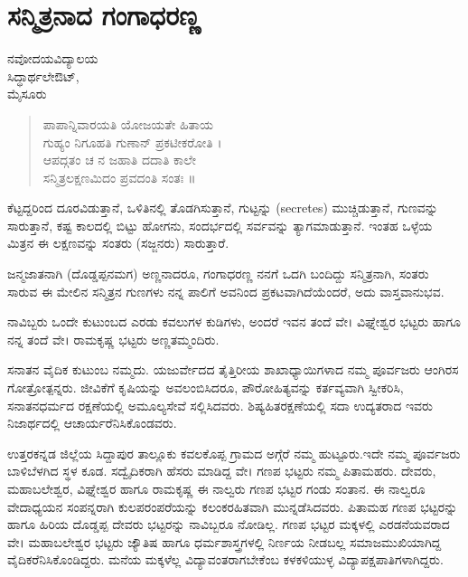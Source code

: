 \chapter{ಸನ್ಮಿತ್ರನಾದ ಗಂಗಾಧರಣ್ಣ}

\begin{center}
\smallskip

ನವೋದಯವಿದ್ಯಾಲಯ\\
ಸಿದ್ಧಾರ್ಥಲೇಔಟ್,\\ 
ಮೈಸೂರು
\addrule
\end{center}

\begin{verse}
ಪಾಪಾನ್ನಿವಾರಯತಿ ಯೋಜಯತೇ ಹಿತಾಯ\\
ಗುಹ್ಯಂ ನಿಗೂಹತಿ ಗುಣಾನ್ ಪ್ರಕಟೀಕರೋತಿ ।\\
ಆಪದ್ಗತಂ ಚ ನ ಜಹಾತಿ ದದಾತಿ ಕಾಲೇ\\
ಸನ್ಮಿತ್ರಲಕ್ಷಣಮಿದಂ ಪ್ರವದಂತಿ ಸಂತಃ ॥
\end{verse}
ಕೆಟ್ಟದ್ದರಿಂದ ದೂರವಿಡುತ್ತಾನೆ, ಒಳಿತಿನಲ್ಲಿ ತೊಡಗಿಸುತ್ತಾನೆ, ಗುಟ್ಟನ್ನು (secretes) ಮುಚ್ಚಿಡುತ್ತಾನೆ, ಗುಣವನ್ನು ಸಾರುತ್ತಾನೆ, ಕಷ್ಟ ಕಾಲದಲ್ಲಿ ಬಿಟ್ಟು ಹೋಗನು, ಸಂದರ್ಭದಲ್ಲಿ ಸರ್ವವನ್ನು ತ್ಯಾಗಮಾಡುತ್ತಾನೆ. ಇಂತಹ ಒಳ್ಳೆಯ ಮಿತ್ರನ ಈ ಲಕ್ಷಣವನ್ನು ಸಂತರು (ಸಜ್ಜನರು) ಸಾರುತ್ತಾರೆ. 

ಜನ್ಮಜಾತನಾಗಿ (ದೊಡ್ಡಪ್ಪನಮಗ) ಅಣ್ಣನಾದರೂ, ಗಂಗಾಧರಣ್ಣ ನನಗೆ ಒದಗಿ ಬಂದಿದ್ದು ಸನ್ಮಿತ್ರನಾಗಿ, ಸಂತರು ಸಾರುವ ಈ ಮೇಲಿನ ಸನ್ಮಿತ್ರನ ಗುಣಗಳು ನನ್ನ ಪಾಲಿಗೆ ಅವನಿಂದ ಪ್ರಕಟವಾಗಿದೆಯೆಂದರೆ, ಅದು ವಾಸ್ತವಾನುಭವ.

ನಾವಿಬ್ಬರು ಒಂದೇ ಕುಟುಂಬದ ಎರಡು ಕವಲುಗಳ ಕುಡಿಗಳು, ಅಂದರೆ ಇವನ ತಂದೆ ವೇ। ವಿಘ್ನೇಶ್ವರ ಭಟ್ಟರು ಹಾಗೂ ನನ್ನ ತಂದೆ ವೇ। ರಾಮಕೃಷ್ಣ ಭಟ್ಟರು ಅಣ್ಣತಮ್ಮಂದಿರು.

ಸನಾತನ ವೈದಿಕ ಕುಟುಂಬ ನಮ್ಮದು. ಯಜುರ್ವೇದದ  ತೈತ್ತಿರೀಯ ಶಾಖಾಧ್ಯಾಯಿಗಳಾದ ನಮ್ಮ  ಪೂರ್ವಜರು ಆಂಗಿರಸ ಗೋತ್ರೋತ್ಪನ್ನರು. ಜೀವಿಕೆಗೆ ಕೃಷಿಯನ್ನು ಅವಲಂಬಿಸಿದರೂ, ಪೌರೋಹಿತ್ಯವನ್ನು ಕರ್ತವ್ಯವಾಗಿ ಸ್ವೀಕರಿಸಿ, ಸನಾತನಧರ್ಮದ ರಕ್ಷಣೆಯಲ್ಲಿ ಅಮೂಲ್ಯಸೇವೆ ಸಲ್ಲಿಸಿದವರು. ಶಿಷ್ಯಹಿತರಕ್ಷಣೆಯಲ್ಲಿ  ಸದಾ ಉದ್ಯತರಾದ ಇವರು ನಿಜಾರ್ಥದಲ್ಲಿ ಆಚಾರ್ಯರೆನಿಸಿಕೊಂಡವರು. 

ಉತ್ತರಕನ್ನಡ ಜಿಲ್ಲೆಯ ಸಿದ್ದಾಪುರ ತಾಲ್ಲೂಕು ಕವಲಕೊಪ್ಪ ಗ್ರಾಮದ ಅಗ್ಗೆರೆ ನಮ್ಮ ಹುಟ್ಟೂರು.ಇದೇ ನಮ್ಮ ಪೂರ್ವಜರು ಬಾಳಿಬೆಳಗಿದ ಸ್ಥಳ ಕೂಡ. ಸದ್ವೈದಿಕರಾಗಿ ಹೆಸರು ಮಾಡಿದ್ದ ವೇ। ಗಣಪ ಭಟ್ಟರು ನಮ್ಮ  ಪಿತಾಮಹರು. ದೇವರು, ಮಹಾಬಲೇಶ್ವರ, ವಿಘ್ನೇಶ್ವರ ಹಾಗೂ ರಾಮಕೃಷ್ಣ ಈ ನಾಲ್ವರು ಗಣಪ ಭಟ್ಟರ ಗಂಡು ಸಂತಾನ. ಈ ನಾಲ್ವರೂ ವೇದಾಧ್ಯಯನ ಸಂಪನ್ನರಾಗಿ ಕುಲಪರಂಪರೆಯನ್ನು ಕಲಂಕರಹಿತವಾಗಿ ಮುನ್ನಡೆಸಿದವರು. ಪಿತಾಮಹ ಗಣಪ ಭಟ್ಟರನ್ನು ಹಾಗೂ ಹಿರಿಯ ದೊಡ್ಡಪ್ಪ ದೇವರು ಭಟ್ಟರನ್ನು ನಾವಿಬ್ಬರೂ ನೋಡಿಲ್ಲ. ಗಣಪ ಭಟ್ಟರ ಮಕ್ಕಳಲ್ಲಿ ಎರಡನೆಯವರಾದ ವೇ। ಮಹಾಬಲೇಶ್ವರ ಭಟ್ಟರು ಜ್ಯೌತಿಷ ಹಾಗೂ ಧರ್ಮಶಾಸ್ತ್ರಗಳಲ್ಲಿ ನಿರ್ಣಯ ನೀಡಬಲ್ಲ ಸಮಾಜಮುಖಿಯಾಗಿದ್ದ ವೈದಿಕರೆನಿಸಿಕೊಂಡಿದ್ದರು. ಮನೆಯ ಮಕ್ಕಳೆಲ್ಲ ವಿದ್ಯಾವಂತರಾಗಬೇಕೆಂಬ ಕಳಕಳಿಯುಳ್ಳ ವಿದ್ಯಾಪಕ್ಷಪಾತಿಗಳಾಗಿದ್ದರು.

